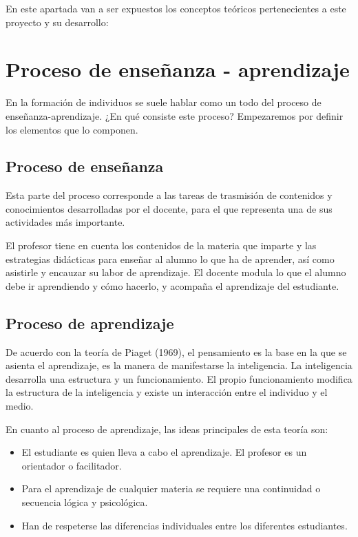 
En este apartada van a ser expuestos los conceptos teóricos pertenecientes a este proyecto y su desarrollo:

\section{Proceso de enseñanza - aprendizaje}
En la formación de individuos se suele hablar como un todo del proceso de enseñanza-aprendizaje\cite{EnsenanzaAprendizaje}. ¿En qué consiste este proceso? Empezaremos por definir los elementos que lo componen.

\subsection{Proceso de enseñanza}
Esta parte del proceso corresponde a las tareas de trasmisión de contenidos y conocimientos desarrolladas por el docente, para el que representa una de sus actividades más importante.

El profesor tiene en cuenta los contenidos de la materia que imparte y las estrategias didácticas para enseñar al alumno lo que ha de aprender, así como asistirle y encauzar su labor de aprendizaje. El docente modula lo que el alumno debe ir aprendiendo y cómo hacerlo, y acompaña el aprendizaje del estudiante. 


\subsection{Proceso de aprendizaje}
De acuerdo con la teoría de Piaget (1969)\cite{Piaget}\cite{Libro:Piaget}, el pensamiento es la base en la que se asienta el aprendizaje, es la manera de manifestarse la inteligencia. La inteligencia desarrolla una estructura y un funcionamiento. El propio funcionamiento modifica la estructura de la inteligencia y existe un interacción entre el individuo y el medio.

En cuanto al proceso de aprendizaje, las ideas principales de esta teoría son:

\begin{itemize}
\item El estudiante es quien lleva a cabo el aprendizaje. El profesor es un orientador o facilitador.
\item Para el aprendizaje de cualquier materia se requiere una continuidad o secuencia lógica y psicológica.
\item Han de respeterse las diferencias individuales entre los diferentes estudiantes.
\end{itemize}

